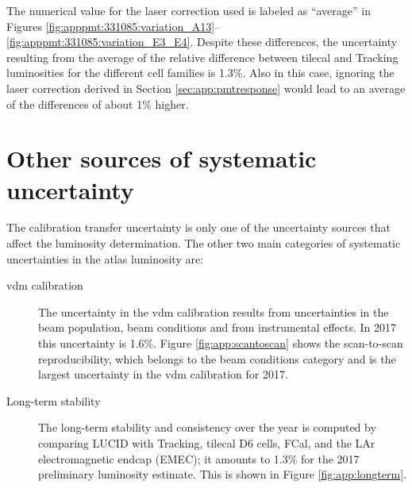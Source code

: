 \noindent The numerical value for the laser correction used is labeled as ``average'' in Figures \ref{fig:apppmt:331085:variation_A13}--\ref{fig:apppmt:331085:variation_E3_E4}. 
Despite these differences, the uncertainty resulting from the average of the relative difference between 
\gls{tilecal} and Tracking luminosities for the different cell families is 1.3\%. Also in this case, ignoring the laser correction derived in 
Section \ref{sec:app:pmtresponse} would lead to an average of the differences of about 1\% higher. 

\FloatBarrier

\section{Other sources of systematic uncertainty}

The calibration transfer uncertainty is only one of the uncertainty sources that affect the luminosity determination. 
The other two main categories of systematic uncertainties in the \gls{atlas} luminosity are:
\begin{description}
\item[\gls{vdm} calibration] The uncertainty in the \gls{vdm} calibration results from uncertainties in the 
beam population, beam conditions and from instrumental effects. In 2017 this uncertainty is 1.6\%. 
Figure \ref{fig:app:scantoscan} shows the scan-to-scan reproducibility, which belongs to the beam conditions category 
and is the largest uncertainty in the \gls{vdm} calibration for 2017.   
\item[Long-term stability] The long-term stability and consistency over the year is computed by comparing LUCID with
 Tracking, \gls{tilecal} D6 cells, FCal, and the LAr electromagnetic endcap (EMEC); 
 it amounts to 1.3\% for the 2017 preliminary 
luminosity estimate. This is shown in Figure \ref{fig:app:longterm}.
\end{description}

